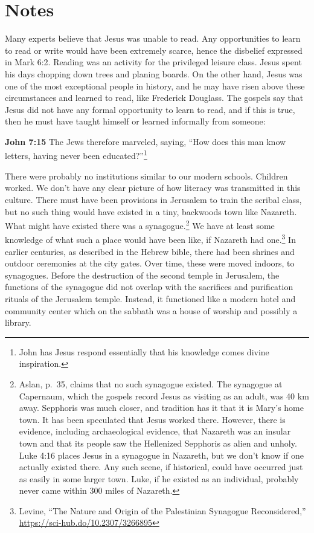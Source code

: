 \documentclass[10pt,twoside]{article} %
\newcommand{\quotesize}{\normalsize{}}
\newcommand{\maintextquotesize}{\renewcommand{\quotesize}{\large{}}}
\newcommand{\notequotesize}{\renewcommand{\quotesize}{\normalsize{}}}
\newenvironment{quotetext}{\begingroup\quotesize}{\endgroup}
\newcommand{\intex}[1]{\index[texts]{#1}}
\newcommand{\bible}[2]{\begin{quotetext}\textbf{#1}\intex{#1} #2\end{quotetext}}
\newcommand{\john}[2]{\bible{John #1}{#2}}
\newenvironment{notesection}[1]{
  \setcounter{secnumdepth}{0}          %
  \section*{#1}
  \setcounter{secnumdepth}{2}          %
  \notequotesize
}%
{
  \maintextquotesize
}
\begin{document}
\begin{notesection}{Notes}
Many experts believe that Jesus was unable to read.  Any opportunities
to learn to read or write would have been extremely scarce, hence the
disbelief expressed in Mark 6:2. Reading was an activity for the
privileged leisure class. Jesus spent his days chopping down trees and
planing boards. On the other hand, Jesus was one of the most
exceptional people in history, and he may have risen above these
circumstances and learned to read, like Frederick Douglass.
The gospels say that Jesus did not have any formal opportunity to learn to read, and if this is true, then he must have
taught himself or learned informally from someone:

\john{7:15}{
The Jews therefore marveled, saying, ``How does this man know letters, having never been educated?''\footnote{John has Jesus
respond essentially that his knowledge comes divine inspiration.}
}

There were probably no institutions similar to our modern schools. Children worked. We don't have any clear picture of how
literacy was transmitted in this culture. There must have been provisions
in Jerusalem to train the scribal class, but no such thing would have existed in a tiny,
backwoods town like Nazareth. What might have existed there was a synagogue.\footnote{Aslan, p.~35, claims that no such synagogue existed. The
synagogue at Capernaum, which the gospels record Jesus as visiting as an adult, was 40 km away. Sepphoris was much closer,
and tradition has it that it is Mary's home town. It has been speculated that Jesus worked there. However, there is evidence, including
archaeological evidence, that Nazareth was an insular town and that its people saw the Hellenized Sepphoris as alien and unholy.
Luke 4:16 places Jesus in a synagogue in
Nazareth, but we don't know if one actually existed there. Any such scene, if historical,
could have occurred just as easily in some larger town. Luke, if he existed as an individual,
probably never came within 300 miles of Nazareth.}
We have at least some knowledge of what such a place would have been like, if Nazareth had 
one.\footnote{Levine, ``The Nature and Origin of the Palestinian Synagogue Reconsidered,'' \url{https://sci-hub.do/10.2307/3266895}}
In earlier centuries, as described in the Hebrew bible, there had been shrines and outdoor ceremonies
at the city gates. Over time, these were moved indoors, to synagogues. Before the destruction of
the second temple in Jerusalem, the functions of the synagogue
did not overlap with the sacrifices and purification rituals of the Jerusalem temple. Instead, it
functioned like a modern hotel and community center which on the sabbath was a house of worship and
possibly a library.


\end{notesection}
\end{document}
